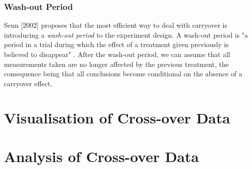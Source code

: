 \documentclass[12pt, TexShade, letterpaper]{report}
\begin{document}
\subsection{Wash-out Period}
Senn [2002] proposes that the most efficient way to deal with carryover is introducing a \textit{wash-out period} to the experiment design. A wash-out period is "a period in a trial during which the effect of a treatment given previously is believed to disappear" \cite{senn2002crossover}. After the wash-out period, we can assume that all measurements taken are no longer affected by the previous treatment, the consequence being that all conclusions become conditional on the absence of a carryover effect.

\chapter{Visualisation of Cross-over Data}

\chapter{Analysis of Cross-over Data}

	{
	
	
	
	
	}
	
\end{document}
